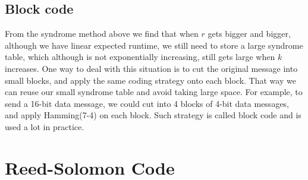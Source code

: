 \documentclass{article}
\begin{document}
\subsection{Block code}
From the syndrome method above we find that when $r$ gets bigger and bigger, although we have linear expected runtime, we still need to store a large syndrome table, which although is not exponentially increasing, still gets large when $k$ increases. One way to deal with this situation is to cut the original message into small blocks, and apply the same coding strategy onto each block. That way we can reuse our small syndrome table and avoid taking large space. For example, to send a 16-bit data message, we could cut into 4 blocks of 4-bit data messages, and apply  Hamming(7-4) on each block. Such strategy is called block code and is used a lot in practice.
\section{Reed-Solomon Code}
\end{document}
